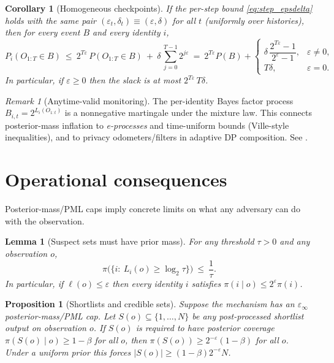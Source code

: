 \documentclass[11pt]{article}
\newtheorem{proposition}{Proposition}
\newtheorem{lemma}{Lemma}
\newtheorem{corollary}{Corollary}
\theoremstyle{definition}
\theoremstyle{remark}
\newtheorem{remark}{Remark}
\begin{document}
\begin{corollary}[Homogeneous checkpoints]\label{cor:homog_checkpoints}
If the per-step bound \eqref{eq:step_epsdelta} holds with the same pair $(\varepsilon_t,\delta_t)\equiv(\varepsilon,\delta)$ for all $t$ (uniformly over histories), then for every event $B$ and every identity $i$,
\[
P_i(O_{1:T}\in B)\ \le\ 2^{T\varepsilon}\,P(O_{1:T}\in B)\ +\ \delta\,\sum_{j=0}^{T-1} 2^{j\varepsilon}
\ =\ 2^{T\varepsilon}P(B)+\begin{cases}
\delta\,\dfrac{2^{T\varepsilon}-1}{2^{\varepsilon}-1}, & \varepsilon\neq 0,\\
T\delta, & \varepsilon=0.
\end{cases}
\]
In particular, if $\varepsilon\ge 0$ then the slack is at most $2^{T\varepsilon}\,T\delta$.
\end{corollary}

\begin{remark}[Anytime-valid monitoring]
The per-identity Bayes factor process $B_{i,t}=2^{L_i(O_{1:t})}$ is a nonnegative martingale under the mixture law.
This connects posterior-mass inflation to \emph{e-processes} and time-uniform bounds (Ville-style inequalities), and to privacy odometers/filters in adaptive DP composition.
See \cite{HowardRamdas2018,RogersOdometers2016}.
\end{remark}

\section{Operational consequences}
Posterior-mass/PML caps imply concrete limits on what any adversary can do with the observation.

\begin{lemma}[Suspect sets must have prior mass]\label{lem:suspect}
For any threshold $\tau>0$ and any observation $o$,
\[
\pi\bigl(\{i:\ L_i(o)\ge \log_2\tau\}\bigr)\ \le\ \frac{1}{\tau}.
\]
In particular, if $\ell(o)\le \varepsilon$ then every identity $i$ satisfies $\pi(i\mid o)\le 2^\varepsilon \pi(i)$.
\end{lemma}

\begin{proposition}[Shortlists and credible sets]\label{prop:shortlist}
Suppose the mechanism has an $\varepsilon_\infty$ posterior-mass/PML cap.
Let $S(o)\subseteq\{1,\dots,N\}$ be any post-processed shortlist output on observation $o$.
If $S(o)$ is required to have posterior coverage $\pi(S(o)\mid o)\ge 1-\beta$ for all $o$, then $\pi(S(o))\ge 2^{-\varepsilon}(1-\beta)$ for all $o$.
Under a uniform prior this forces $|S(o)|\ge (1-\beta)2^{-\varepsilon}N$.
\end{proposition}
\end{document}
